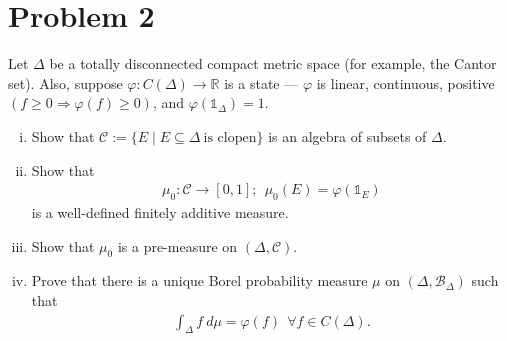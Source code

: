 \documentclass[10pt]{extarticle}
\newcommand{\R}{\mathbb{R}}
\begin{document}
  \section{Problem 2}%
  Let $\Delta$ be a totally disconnected compact metric space (for example, the Cantor set). Also, suppose $\varphi: C(\Delta)\rightarrow \R$ is a state --- $\varphi$ is linear, continuous, positive $(f \geq 0 \Rightarrow \varphi(f) \geq 0)$, and $\varphi(\mathbb{1}_{\Delta}) = 1$.
  \begin{enumerate}[(i)]
    \item Show that $\mathcal{C} := \{E\mid E\subseteq \Delta~\text{is clopen}\}$ is an algebra of subsets of $\Delta$.
    \item Show that
      \begin{align*}
        \mu_0: \mathcal{C} \rightarrow [0,1];~~\mu_0(E) = \varphi(\mathbb{1}_{E})
      \end{align*}
      is a well-defined finitely additive measure.
    \item Show that $\mu_0$ is a pre-measure on $(\Delta,\mathcal{C})$.
    \item Prove that there is a unique Borel probability measure $\mu$ on $(\Delta,\mathcal{B}_{\Delta})$ such that
      \begin{align*}
        \int_{\Delta}f~d\mu = \varphi(f)~~\forall f\in C(\Delta).
      \end{align*}
  \end{enumerate}
\end{document}
